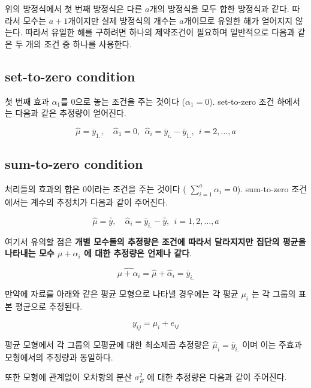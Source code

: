 \documentclass[
  10pt,
]{book}
\theoremstyle{definition}
\theoremstyle{definition}
\theoremstyle{definition}
\theoremstyle{definition}
\theoremstyle{remark}
\begin{document}
위의 방정식에서 첫 번째 방정식은 다른 \(a\)개의 방정식을 모두 합한 방정식과 같다. 따라서 모수는 \(a+1\)개이지만 실제 방정식의 개수는 \(a\)개이므로
유일한 해가 얻어지지 않는다. 따라서 유일한 해를 구하려면 하나의 제약조건이 필요하며 일반적으로 다음과 같은 두 개의 조건 중 하나를 사용한다.

\hypertarget{set-to-zero-condition}{%
\subsection{set-to-zero condition}\label{set-to-zero-condition}}

첫 번째 효과 \(\alpha_1\)를 0으로 놓는 조건을 주는 것이다 (\(\alpha_1=0\)). set-to-zero 조건 하에서는 다음과 같은 추정량이 얻어진다.

\begin{equation}
\hat \mu = \bar {y}_{1.}, \quad \hat \alpha_1=0, ~~  \hat \alpha_i = \bar {y}_{i.} -\bar {y}_{1.},~~i=2,\dots,a
\label{eq:setzeroest}
\end{equation}

\hypertarget{sum-to-zero-condition}{%
\subsection{sum-to-zero condition}\label{sum-to-zero-condition}}

처리들의 효과의 합은 0이라는 조건을 주는 것이다 ( \(\sum_{i=1}^a \alpha_i=0\)). sum-to-zero 조건에서는 계수의 추정치가 다음과 같이 주어진다.

\begin{equation}
\hat \mu = \bar {\bar {y}}, \quad \hat \alpha_i = \bar {y}_{i.} -\bar {\bar {y}},~~i=1,2,\dots,a 
\label{eq:sumzeroest}
\end{equation}

여기서 유의할 점은 \textbf{개별 모수들의 추정량은 조건에 따라서 달라지지만 집단의 평균을 나타내는 모수 \(\mu+ \alpha_i\) 에 대한 추정량은 언제나 같다}.

\[ \widehat{\mu+ \alpha_i} = \hat \mu + \hat {\alpha}_i =  \bar {y}_{i.} \]

만약에 자료를 아래와 같은 평균 모형으로 나타낼 경우에는 각 평균 \(\mu_i\) 는 각 그룹의 표본 평균으로 추정된다.

\[ y_{ij} = \mu_i + e_{ij} \]

평균 모형에서 각 그룹의 모평균에 대한 최소제곱 추정량은 \(\hat \mu_i = \bar {y}_{i.}\) 이며 이는 주효과 모형에서의 추정량과 동일하다.

또한 모형에 관계없이 오차항의 분산 \(\sigma_E^2\) 에 대한 추정량은 다음과 같이 주어진다.
\end{document}
